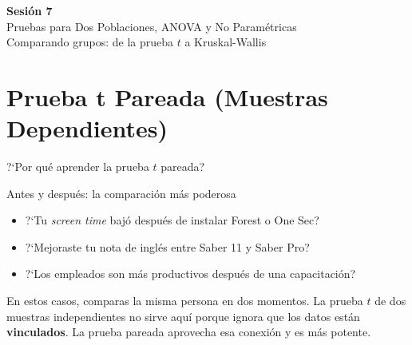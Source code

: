 \documentclass[aspectratio=169, 11pt]{beamer}
\begin{document}
\begin{frame}{}
\vfill
\centering
{\Large\textbf{Sesi\'on 7}}\\[1em]
{\normalsize Pruebas para Dos Poblaciones, ANOVA y No Param\'etricas}\\[0.5em]
{\small Comparando grupos: de la prueba $t$ a Kruskal-Wallis}
\vfill
\end{frame}

\section{Prueba t Pareada (Muestras Dependientes)}

\begin{frame}{?`Por qu\'e aprender la prueba $t$ pareada?}
\small
\begin{exampleblock}{Antes y despu\'es: la comparaci\'on m\'as poderosa}
\begin{itemize}\setlength{\itemsep}{2pt}
  \item ?`Tu \textit{screen time} baj\'o despu\'es de instalar Forest o One Sec?
  \item ?`Mejoraste tu nota de ingl\'es entre Saber 11 y Saber Pro?
  \item ?`Los empleados son m\'as productivos despu\'es de una capacitaci\'on?
\end{itemize}
\end{exampleblock}

\vspace{0.2cm}
En estos casos, comparas \alert{la misma persona} en dos momentos. La prueba $t$ de dos muestras independientes no sirve aqu\'i porque ignora que los datos est\'an \textbf{vinculados}. La prueba pareada aprovecha esa conexi\'on y es m\'as potente.
\end{frame}
\end{document}
